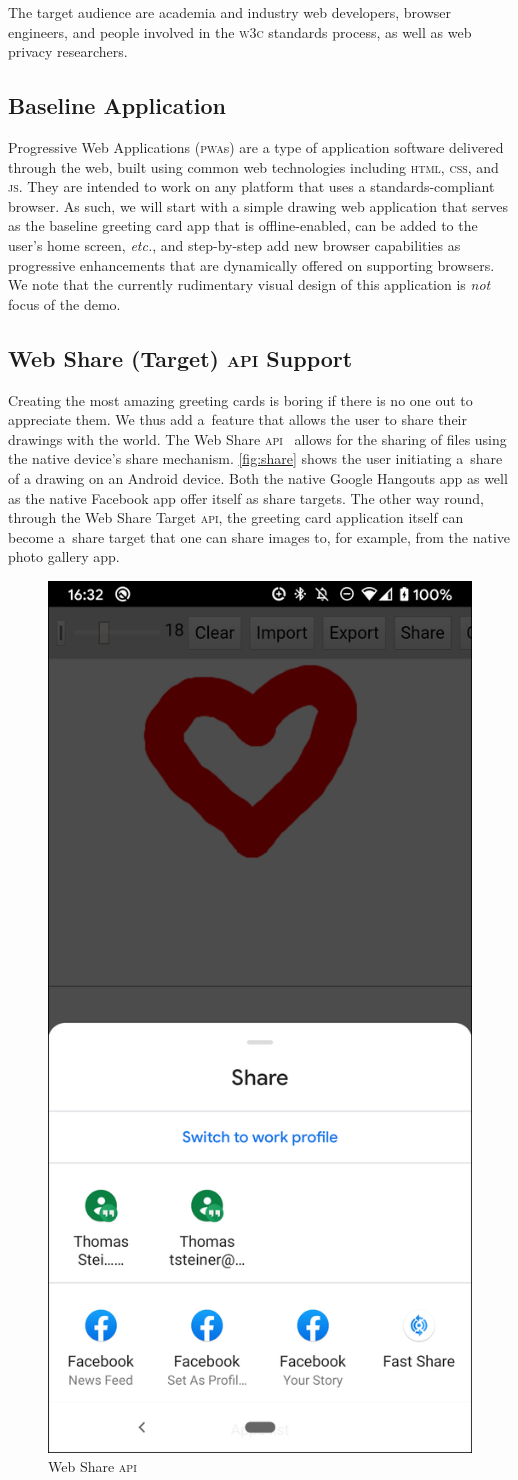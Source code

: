 \documentclass[sigconf, anonymous]{acmart}
\begin{document}
The target audience are academia and industry web developers, browser engineers,
and people involved in the \textsc{w3c} standards process,
as well as web privacy researchers.

\subsection{Baseline Application}

Progressive Web Applications (\textsc{pwa}s) are a type of application software
delivered through the web, built using common web technologies
including \textsc{html}, \textsc{css}, and \textsc{js}.
They are intended to work on any platform that uses a standards-compliant browser.
As such, we will start with a simple drawing web application
that serves as the baseline greeting card app that is offline-enabled,
can be added to the user's home screen, \textit{etc.},
and step-by-step add new browser capabilities
as progressive enhancements that are dynamically offered on supporting browsers.
We note that the currently rudimentary visual design of this application is \textit{not} focus of the demo.

\subsection{Web Share (Target) \textsc{api} Support}

Creating the most amazing greeting cards is boring if there is no one out to appreciate them.
We thus add a~feature that allows the user to share their drawings with the world.
The Web Share \textsc{api}~\cite{giuca2017webshare} allows for the sharing of files
using the native device's share mechanism.
\autoref{fig:share} shows the user initiating a~share of a drawing on an Android device.
Both the native Google Hangouts app as well as the native Facebook app offer itself
as share targets.
The other way round, through the Web Share Target \textsc{api},
the greeting card application itself can become a~share target
that one can share images to, for example, from the native photo gallery app.

\begin{figure}[hbt]
  \includegraphics[width=0.3\columnwidth]{share.png}
  \caption{Web Share \textsc{api}}
  \label{fig:share}
\end{figure}
\end{document}
